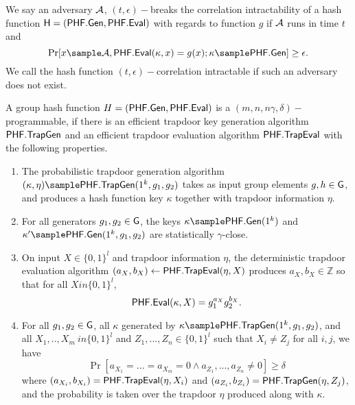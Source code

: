 \begin{definition}
We say an adversary $\mathcal{A}$, $(t, \epsilon)-$breaks the correlation intractability of a hash function  $\mathsf{H} = (\mathsf{PHF}.\mathsf{Gen}, \mathsf{PHF}.\mathsf{Eval})$ with regards to function $g$ if $\mathcal{A}$ runs in time $t$ and 
$$\Pr[x \sample \adv, \phfEval(\kappa, x) = g(x); \kappa \sample \phfGen] \geq \epsilon.$$
We call the hash function $(t, \epsilon)-$correlation intractable if such an adversary does not exist.
\end{definition}


\begin{definition}
A group hash function $H = (\mathsf{PHF}.\mathsf{Gen}, \mathsf{PHF}.\mathsf{Eval})$ is a $(m,n,n\gamma,\delta)-$programmable, if there is an efficient trapdoor key generation algorithm $\mathsf{PHF}.\mathsf{TrapGen}$ and an efficient trapdoor evaluation algorithm $\mathsf{PHF}.\mathsf{TrapEval}$ with the following properties.
\begin{enumerate}
\item The probabilistic  trapdoor generation algorithm 
$(\kappa, \eta) \sample \phfTG(1^k,g_1,g_2)$ takes as input group elements 
$g,h \in \mathsf{G}$, and produces a hash function key $\kappa$ together with trapdoor information 
$\eta$.
\item For all generators
$g_1,g_2 \in \mathsf{G}$, the keys 
$\kappa \sample \phfGen(1^k)$ and 
$\kappa' \sample \phfGen(1^k,g_1,g_2)$ are statistically
$\gamma$-close.
\item 
On input $X \in \{0,1\}^l$ and trapdoor information $\eta$, the deterministic trapdoor evaluation algorithm
$(a_X,b_X) \leftarrow \mathsf{PHF}.\mathsf{TrapEval}(\eta,X)$ produces $a_X,b_X \in \mathbb{Z}$ so that for all 
$Xin \{0,1\}^l$,
$$\mathsf{PHF}.\mathsf{Eval}(\kappa, X) = g_1^{a_X}g_2^{b_X}.$$
\item For all $g_1,g_2 \in \mathsf{G}$, all $\kappa$ generated by 
$\kappa \sample \phfTG(1^k,g_1,g_2)$, and all 
$X_1,..,X_m \ in \{0,1\}^l$ and
$Z_1,...,Z_n \in \{0,1\}^l$ such that $X_i \neq Z_j$ for all $i,j$, we have
$$\Pr[a_{X_1}=...=a_{X_m}= 0 \land a_{Z_1},...,a_{Z_n} \neq 0]\geq \delta$$
where 
$(a_{X_i},b_{X_i}) = \mathsf{PHF}.\mathsf{TrapEval}(\eta, X_i)$ and $(a_{Z_i},b_{Z_i}) = \mathsf{PHF}.\mathsf{TrapGen}(\eta, Z_j)$, and the probability is taken over the trapdoor $\eta$ produced along with $\kappa$.
\end{enumerate}
\end{definition}












